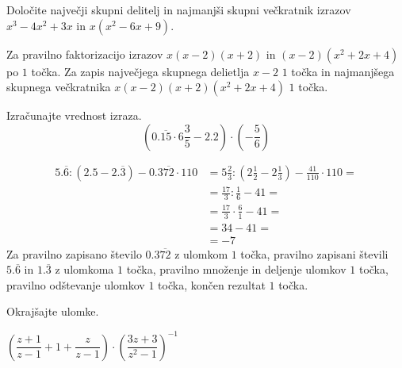 \documentclass[addpoints]{exam}
\begin{document}
\begin{questions}



    \question[4]
    Določite največji skupni delitelj in najmanjši skupni večkratnik izrazov $x^3-4x^2+3x$ in $x(x^2-6x+9)$.

    \begin{solution}[7cm]
        Za pravilno faktorizacijo izrazov $x(x-2)(x+2)$ in $(x-2)(x^2+2x+4)$ po $1$ točka. 
        Za zapis največjega skupnega delietlja $x-2$ $1$ točka in najmanjšega skupnega večkratnika $x(x-2)(x+2)(x^2+2x+4)$ $1$ točka.
    \end{solution}
    

    

    \question[4]
    Izračunajte vrednost izraza.
        $$\left(0.\overline{15}\cdot 6\frac{3}{5}-2.2\right)\cdot\left(-\frac{5}{6}\right) $$

        \begin{solution}[4cm]
            \begin{align*}
                5.\overline{6}:(2.5-2.\overline{3}) - 0.3\overline{72}\cdot 110&=5\frac{2}{3}:(2\frac{1}{2}-2\frac{1}{3})- \frac{41}{110}\cdot 110 = \\
                                                                            &=\frac{17}{3}:\frac{1}{6}-41= \\
                                                                            &=\frac{17}{3}\cdot \frac{6}{1}-41= \\
                                                                            &=34-41= \\
                                                                            &= -7
            \end{align*}
            Za pravilno zapisano število $0.3\overline{72}$ z ulomkom $1$ točka, pravilno zapisani števili $5.\overline{6}$ in $1.\overline{3}$ z ulomkoma $1$ točka, pravilno množenje in deljenje ulomkov $1$ točka, pravilno odštevanje ulomkov $1$ točka, končen rezultat $1$ točka.
        \end{solution}




    \newpage

    \question[4]
    Okrajšajte ulomke.
        

        $\left(\dfrac{z+1}{z-1}+1+\dfrac{z}{z-1}\right)\cdot\left(\dfrac{3z+3}{z^2-1}\right)^{-1}$


\end{questions}
\end{document}
